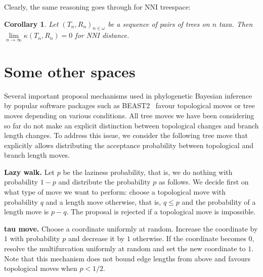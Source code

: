 \documentclass{amsart}
\newtheorem{corollary}[lemma]{Corollary}
\begin{document}
Clearly, the same reasoning goes through for NNI treespace:

\begin{corollary}
Let $(T_n,R_n)_{n\in\omega}$ be a sequence of pairs of trees on $n$ taxa.
Then $\lim\limits_{n \to \infty}\kappa(T_n,R_n) = 0$ for NNI distance. 
\end{corollary}

\section{Some other spaces}

Several important proposal mechanisms used in phylogenetic Bayesian inference by 
popular software packages such as BEAST2~\cite{beast2} favour topological moves
or tree moves depending on various conditions. All tree moves we have been 
considering so far do not make an explicit distinction between topological 
changes and branch length changes. To address this issue, we
consider the
following tree move that explicitly allows distributing the acceptance 
probability between topological and branch length moves. 

{\bf Lazy walk.} Let $p$ be the laziness probability, that is, we do nothing 
with probability $1-p$ and distribute the probability $p$ as follows. 
We decide first on what type of move we want to perform: choose a topological 
move with probability $q$ and a length move otherwise, that is, $q \leq p$
and the probability of a length move is $p-q$. The proposal is rejected if
a topological move is impossible. 

{\bf tau move.} Choose a coordinate uniformly at random. Increase the
coordinate by $1$ with probability $p$ and decrease it by $1$ otherwise.
If the coordinate becomes $0$, resolve the multifurcation uniformly at
random and set the new coordinate to $1$. Note that this mechanism 
does not bound edge lengths from above and favours topological moves when 
$p<1/2$. 



\end{document}
